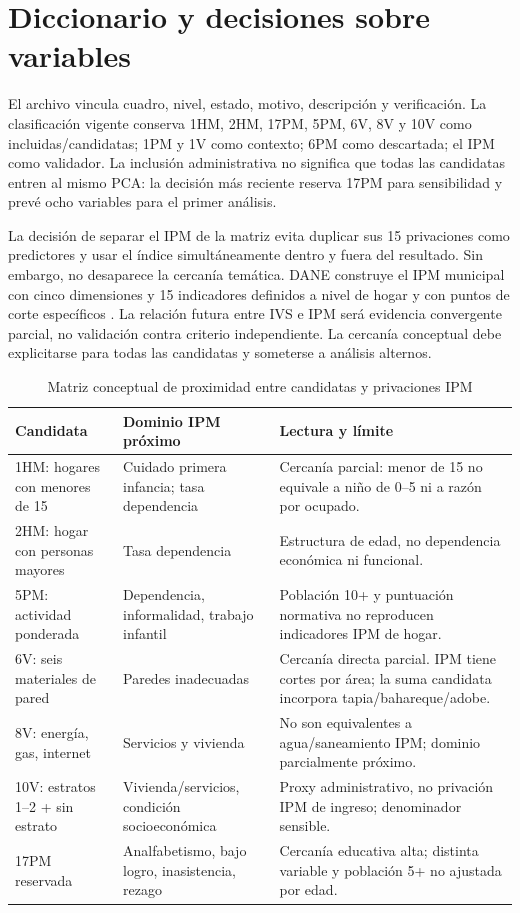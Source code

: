 \documentclass[11pt,a4paper]{article}
\begin{document}
\section{Diccionario y decisiones sobre variables}

El archivo  vincula cuadro, nivel, estado, motivo, descripción y verificación. La clasificación vigente conserva 1HM, 2HM, 17PM, 5PM, 6V, 8V y 10V como incluidas/candidatas; 1PM y 1V como contexto; 6PM como descartada; el IPM como validador. La inclusión administrativa no significa que todas las candidatas entren al mismo PCA: la decisión más reciente reserva 17PM para sensibilidad y prevé ocho variables para el primer análisis.

La decisión de separar el IPM de la matriz evita duplicar sus 15 privaciones como predictores y usar el índice simultáneamente dentro y fuera del resultado. Sin embargo, no desaparece la cercanía temática. DANE construye el IPM municipal con cinco dimensiones y 15 indicadores definidos a nivel de hogar y con puntos de corte específicos \citep{dane_ipm_censal_2018}. La relación futura entre IVS e IPM será evidencia convergente parcial, no validación contra criterio independiente. La cercanía conceptual debe explicitarse para todas las candidatas y someterse a análisis alternos.

\begin{table}[htbp]
\centering\small
\caption{Matriz conceptual de proximidad entre candidatas y privaciones IPM}
\label{tab:solapamiento}
\begin{tabularx}{\textwidth}{P{0.22\textwidth}P{0.28\textwidth}Y}
\toprule
\textbf{Candidata} & \textbf{Dominio IPM próximo} & \textbf{Lectura y límite}\\
\midrule
1HM: hogares con menores de 15 & Cuidado primera infancia; tasa dependencia & Cercanía parcial: menor de 15 no equivale a niño de 0--5 ni a razón por ocupado.\\
2HM: hogar con personas mayores & Tasa dependencia & Estructura de edad, no dependencia económica ni funcional.\\
5PM: actividad ponderada & Dependencia, informalidad, trabajo infantil & Población 10+ y puntuación normativa no reproducen indicadores IPM de hogar.\\
6V: seis materiales de pared & Paredes inadecuadas & Cercanía directa parcial. IPM tiene cortes por área; la suma candidata incorpora tapia/bahareque/adobe.\\
8V: energía, gas, internet & Servicios y vivienda & No son equivalentes a agua/saneamiento IPM; dominio parcialmente próximo.\\
10V: estratos 1--2 + sin estrato & Vivienda/servicios, condición socioeconómica & Proxy administrativo, no privación IPM de ingreso; denominador sensible.\\
17PM reservada & Analfabetismo, bajo logro, inasistencia, rezago & Cercanía educativa alta; distinta variable y población 5+ no ajustada por edad.\\
\bottomrule
\end{tabularx}
\end{table}
\end{document}

